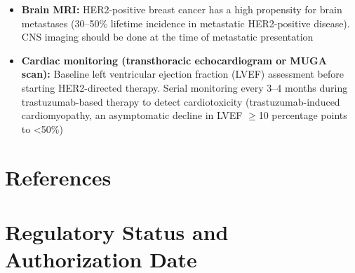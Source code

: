 \begin{itemize}
  \item \textbf{Brain MRI:} HER2-positive breast cancer has a high propensity for brain metastases (30--50\% lifetime incidence in metastatic HER2-positive disease). CNS imaging should be done at the time of metastatic presentation
  \item \textbf{Cardiac monitoring (transthoracic echocardiogram or MUGA scan):} Baseline left ventricular ejection fraction (LVEF) assessment before starting HER2-directed therapy. Serial monitoring every 3--4 months during trastuzumab-based therapy to detect cardiotoxicity (trastuzumab-induced cardiomyopathy, an asymptomatic decline in LVEF $\geq$10 percentage points to <50\%)
\end{itemize}

\section*{References}



\clearpage
\section*{Regulatory Status and Authorization Date}

\clearpage
